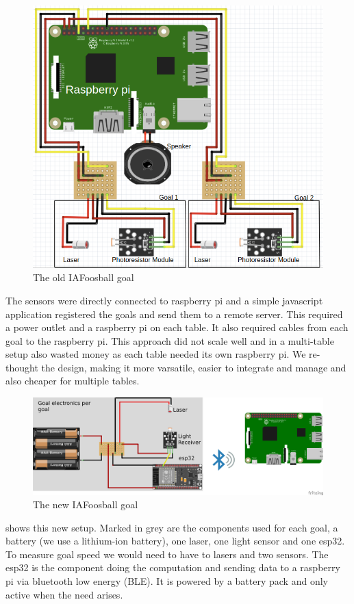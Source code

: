 \begin{figure}[h!]
    \centering
    \includegraphics[scale=0.3]{figures/goal-old.png}
    \caption{The old IAFoosball goal}\label{fig:goalOld}
\end{figure}

The sensors were directly connected to raspberry pi and a simple javascript application registered the goals and send them to a remote server. This required a power outlet and a raspberry pi on each table. It also required cables from each goal to the raspberry pi. This approach did not scale well and in a multi-table setup also wasted money as each table needed its own raspberry pi. We re-thought the design, making it more varsatile, easier to integrate and manage and also cheaper for multiple tables.

\begin{figure}[h!]
    \centering
    \includegraphics[scale=0.4]{figures/goal-new.png}%
    \caption{The new IAFoosball goal}\label{fig:goalNew}
\end{figure}

 shows this new setup. Marked in grey are the components used for each goal, a battery (we use a lithium-ion battery), one laser, one light sensor and one esp32. To measure goal speed we would need to have to lasers and two sensors. The esp32 is the component doing the computation and sending data to a raspberry pi via bluetooth low energy (BLE). It is powered by a battery pack and only active when the need arises.\\

